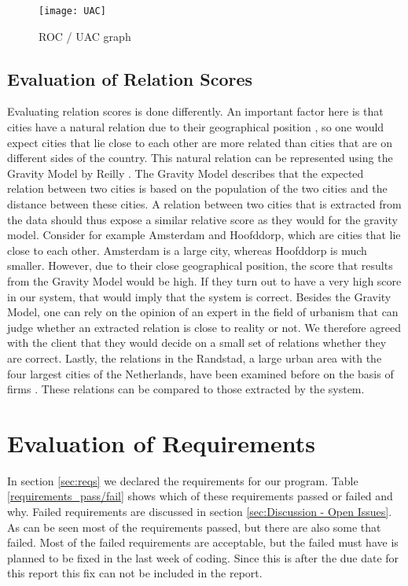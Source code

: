 
\begin{figure}[ht]
\centering
\texttt{[image: UAC]}
\caption{ROC / UAC graph \protect\footnotemark{}}
\label{fig:UAC}
\end{figure}

\subsection{Evaluation of Relation Scores} \label{sec:validation_protocol}
Evaluating relation scores is done differently. An important factor here is that cities have a natural relation due to their geographical position \cite{tobler1970computer}, so one would expect cities that lie close to each other are more related than cities that are on different sides of the country. This natural relation can be represented using the Gravity Model by Reilly \cite{reilly1931law}. The Gravity Model describes that the expected relation between two cities is based on the population of the two cities and the distance between these cities. A relation between two cities that is extracted from the data should thus expose a similar relative score as they would for the gravity model. Consider for example Amsterdam and Hoofddorp, which are cities that lie close to each other. Amsterdam is a large city, whereas Hoofddorp is much smaller. However, due to their close geographical position, the score that results from the Gravity Model would be high. If they turn out to have a very high score in our system, that would imply that the system is correct. Besides the Gravity Model, one can rely on the opinion of an expert in the field of urbanism that can judge whether an extracted relation is close to reality or not. We therefore agreed with the client that they would decide on a small set of relations whether they are correct. Lastly, the relations in the Randstad, a large urban area with the four largest cities of the Netherlands, have been examined before on the basis of firms \cite{van2010economic}. These relations can be compared to those extracted by the system.

\section{Evaluation of Requirements}
In section \ref{sec:reqs} we declared the requirements for our program. Table \ref{requirements_pass/fail} shows which of these requirements passed or failed and why. Failed requirements are discussed in section \ref{sec:Discussion - Open Issues}. As can be seen most of the requirements passed, but there are also some that failed. Most of the failed requirements are acceptable, but the failed must have is planned to be fixed in the last week of coding. Since this is after the due date for this report this fix can not be included in the report.\\

